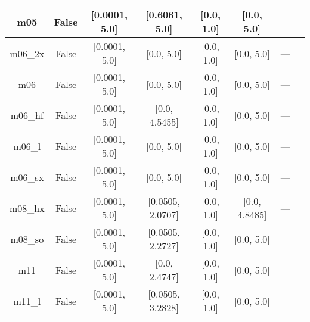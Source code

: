 \begin{tabular}{|c|c|c|c|c|c|c|l|}
          m05 &                 False &    [0.0001, 5.0] &    [0.6061, 5.0] &       [0.0, 1.0] &     [0.0, 5.0] &        --- &                                                             \cite{Zhao2005_161103} \\ \hline
      m06\_2x &                 False &    [0.0001, 5.0] &       [0.0, 5.0] &       [0.0, 1.0] &     [0.0, 5.0] &        --- &                                                                \cite{Zhao2008_215} \\ \hline
          m06 &                 False &    [0.0001, 5.0] &       [0.0, 5.0] &       [0.0, 1.0] &     [0.0, 5.0] &        --- &                                                                \cite{Zhao2008_215} \\ \hline
      m06\_hf &                 False &    [0.0001, 5.0] &    [0.0, 4.5455] &       [0.0, 1.0] &     [0.0, 5.0] &        --- &                                                              \cite{Zhao2006_13126} \\ \hline
       m06\_l &                 False &    [0.0001, 5.0] &       [0.0, 5.0] &       [0.0, 1.0] &     [0.0, 5.0] &        --- &                                                \cite{Zhao2006_194101,Zhao2008_215} \\ \hline
      m06\_sx &                 False &    [0.0001, 5.0] &       [0.0, 5.0] &       [0.0, 1.0] &     [0.0, 5.0] &        --- &                                                               \cite{Wang2020_2294} \\ \hline
      m08\_hx &                 False &    [0.0001, 5.0] & [0.0505, 2.0707] &       [0.0, 1.0] &  [0.0, 4.8485] &        --- &                                                               \cite{Zhao2008_1849} \\ \hline
      m08\_so &                 False &    [0.0001, 5.0] & [0.0505, 2.2727] &       [0.0, 1.0] &     [0.0, 5.0] &        --- &                                                               \cite{Zhao2008_1849} \\ \hline
          m11 &                 False &    [0.0001, 5.0] &    [0.0, 2.4747] &       [0.0, 1.0] &     [0.0, 5.0] &        --- &                                                           \cite{Peverati2011_2810} \\ \hline
       m11\_l &                 False &    [0.0001, 5.0] & [0.0505, 3.2828] &       [0.0, 1.0] &     [0.0, 5.0] &        --- &                                                            \cite{Peverati2012_117} \\ \hline

\end{tabular}

